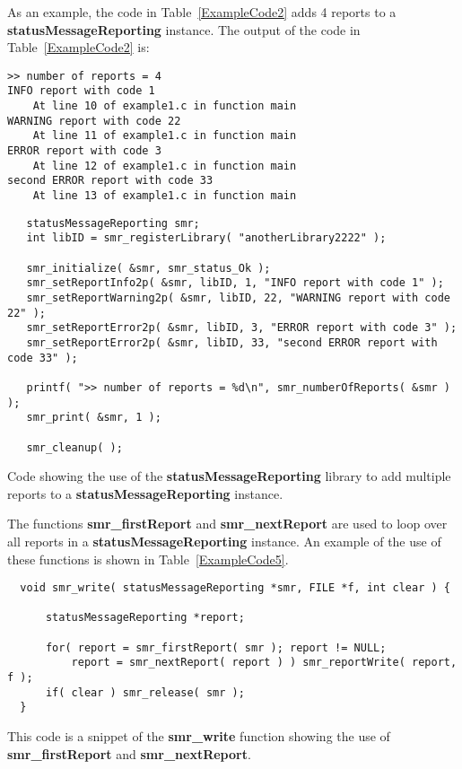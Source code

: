 \documentclass[11pt]{article}
\begin{document}
As an example, the code in Table~\ref{ExampleCode2} adds 4 reports to a \textbf{statusMessageReporting} instance. 
The output of the code in Table~\ref{ExampleCode2} is:

\begin{verbatim}
>> number of reports = 4
INFO report with code 1
    At line 10 of example1.c in function main
WARNING report with code 22
    At line 11 of example1.c in function main
ERROR report with code 3
    At line 12 of example1.c in function main
second ERROR report with code 33
    At line 13 of example1.c in function main
\end{verbatim}

\begin{table}
\begin{verbatim}
   statusMessageReporting smr;
   int libID = smr_registerLibrary( "anotherLibrary2222" );

   smr_initialize( &smr, smr_status_Ok );
   smr_setReportInfo2p( &smr, libID, 1, "INFO report with code 1" );
   smr_setReportWarning2p( &smr, libID, 22, "WARNING report with code 22" );
   smr_setReportError2p( &smr, libID, 3, "ERROR report with code 3" );
   smr_setReportError2p( &smr, libID, 33, "second ERROR report with code 33" );

   printf( ">> number of reports = %d\n", smr_numberOfReports( &smr ) );
   smr_print( &smr, 1 );

   smr_cleanup( );
\end{verbatim}
\caption{Code showing the use of the \textbf{statusMessageReporting} library to add multiple reports to a
	\textbf{statusMessageReporting} instance.} \label{ExampleCode2}
\end{table}

The functions \textbf{smr\_firstReport} and \textbf{smr\_nextReport} are used to loop over all reports in a 
\textbf{statusMessageReporting} instance. An example
of the use of these functions is shown in Table~\ref{ExampleCode5}.

\begin{table}
\begin{verbatim}
  void smr_write( statusMessageReporting *smr, FILE *f, int clear ) {

      statusMessageReporting *report;

      for( report = smr_firstReport( smr ); report != NULL; 
          report = smr_nextReport( report ) ) smr_reportWrite( report, f );
      if( clear ) smr_release( smr );
  }
\end{verbatim}
\caption{This code is a snippet of the \textbf{smr\_write} function showing the use of \textbf{smr\_first\-Report}
and \textbf{smr\_nextReport}.  \label{ExampleCode5}}
\end{table}
\end{document}
